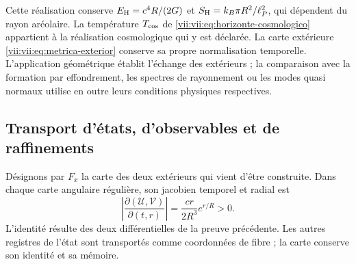 Cette réalisation conserve
\(E_{\rm H}=c^4R/(2G)\) et
\(S_{\rm H}=k_B\pi R^2/\ell_P^2\), qui dépendent du rayon aréolaire.
La température \(T_{\rm cos}\) de
\eqref{vii:vii:eq:horizonte-cosmologico} appartient à la réalisation
cosmologique qui y est déclarée. La carte extérieure
\eqref{vii:vii:eq:metrica-exterior} conserve sa propre normalisation temporelle.
L'application géométrique établit l'échange des extérieurs ; la comparaison
avec la formation par effondrement, les spectres de rayonnement ou les modes quasi normaux
utilise en outre leurs conditions physiques respectives.

\subsection{Transport d'états, d'observables et de raffinements}
\label{vii:vii:subsec:transporte-informacion-horizonte}

Désignons par \(F_x\) la carte des deux extérieurs qui vient d'être construite. Dans chaque carte angulaire régulière, son jacobien temporel et radial est
\begin{equation}
 \left|\frac{\partial(\mathcal U,\mathcal V)}{\partial(t,r)}\right|
 =\frac{cr}{2R^3}e^{r/R}>0.
 \label{vii:vii:eq:jacobiano-kruskal}
\end{equation}
L'identité résulte des deux différentielles de la preuve précédente.
Les autres registres de l'état sont transportés comme coordonnées de
fibre ; la carte conserve son identité et sa mémoire.

